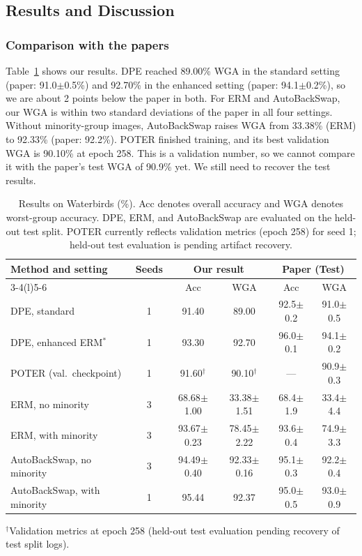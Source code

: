 \documentclass[runningheads]{llncs}
\begin{document}
\subsection{Results and Discussion}
\subsubsection{Comparison with the papers}
Table~\ref{tab1} shows our results. DPE reached 89.00\% WGA in the standard setting (paper: 91.0$\pm$0.5\%) and 92.70\% in the enhanced setting (paper: 94.1$\pm$0.2\%), so we are about 2 points below the paper in both. For ERM and AutoBackSwap, our WGA is within two standard deviations of the paper in all four settings. Without minority-group images, AutoBackSwap raises WGA from 33.38\% (ERM) to 92.33\% (paper: 92.2\%). POTER finished training, and its best validation WGA is 90.10\% at epoch 258. This is a validation number, so we cannot compare it with the paper's test WGA of 90.9\% yet. We still need to recover the test results.

\begin{table}[t]
\centering
\caption{Results on Waterbirds (\%). Acc denotes overall accuracy and WGA denotes worst-group accuracy. DPE, ERM, and AutoBackSwap are evaluated on the held-out test split. POTER currently reflects validation metrics (epoch 258) for seed 1; held-out test evaluation is pending artifact recovery.}
\label{tab1}
\small
\setlength{\tabcolsep}{3.5pt}
\begin{tabular}{@{}lccccc@{}}
\toprule
Method and setting & Seeds & \multicolumn{2}{c}{Our result} & \multicolumn{2}{c}{Paper (Test)} \\
\cmidrule(lr){3-4}\cmidrule(l){5-6}
 & & Acc & WGA & Acc & WGA \\
\midrule
DPE, standard & 1 & 91.40 & 89.00 & 92.5$\pm$0.2 & 91.0$\pm$0.5 \\
DPE, enhanced ERM$^*$ & 1 & 93.30 & 92.70 & 96.0$\pm$0.1 & 94.1$\pm$0.2 \\
\midrule
POTER (val.\ checkpoint) & 1 & 91.60$^\dagger$ & 90.10$^\dagger$ & --- & 90.9$\pm$0.3 \\
\midrule
ERM, no minority & 3 & 68.68$\pm$1.00 & 33.38$\pm$1.51 & 68.4$\pm$1.9 & 33.4$\pm$4.4 \\
ERM, with minority & 3 & 93.67$\pm$0.23 & 78.45$\pm$2.22 & 93.6$\pm$0.4 & 74.9$\pm$3.3 \\
AutoBackSwap, no minority & 3 & 94.49$\pm$0.40 & 92.33$\pm$0.16 & 95.1$\pm$0.3 & 92.2$\pm$0.4 \\
AutoBackSwap, with minority & 1 & 95.44 & 92.37 & 95.0$\pm$0.5 & 93.0$\pm$0.9 \\
\bottomrule
\end{tabular}
\par\vspace{3pt}
{\footnotesize $^\dagger$Validation metrics at epoch 258 (held-out test evaluation pending recovery of test split logs).}
\end{table}
\end{document}
